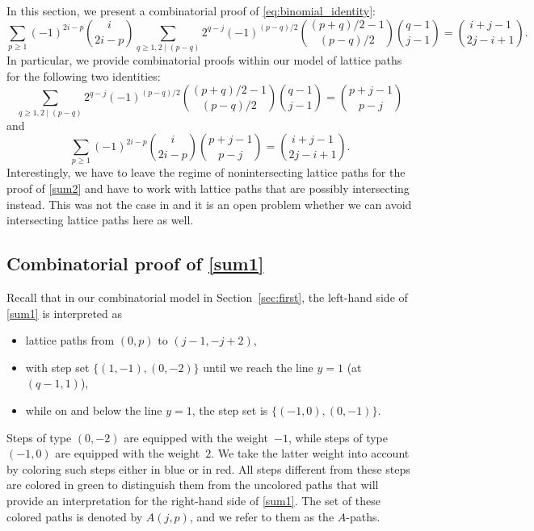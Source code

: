 \documentclass[12pt]{amsart}
\theoremstyle{definition}
\numberwithin{equation}{section}
\begin{document}
In this section, we present a combinatorial proof of \eqref{eq:binomial_identity}:
\begin{equation*}
	\sum_{p \ge 1} (-1)^{2i-p} \binom{i}{2i-p}  \sum_{q \ge 1,2 \mid (p-q)}  2^{q-j} (-1)^{(p-q)/2} \binom{(p+q)/2-1}{(p-q)/2} \binom{q-1}{j-1}
	=  \binom{i+j-1}{2j-i+1}.
\end{equation*}
In particular, we provide combinatorial proofs within our model of lattice paths for the following two identities:
\begin{equation}
	\label{sum1} 
	\sum_{q \ge 1, 2 \mid (p-q)}  2^{q-j} (-1)^{(p-q)/2} \binom{(p+q)/2-1}{(p-q)/2} \binom{q-1}{j-1} = \binom{p+j-1}{p-j}
\end{equation} 
and
\begin{equation}
	\label{sum2} 
	\sum_{p \ge 1} (-1)^{2i-p} \binom{i}{2i-p} \binom{p+j-1}{p-j} = \binom{i+j-1}{2j-i+1}.
\end{equation}
Interestingly, we have to leave the regime of nonintersecting lattice paths for the proof of \eqref{sum2} and have to work with lattice paths that are possibly intersecting instead. This was not the case in \cite{nASMDPP} and it is an open problem whether we can avoid intersecting lattice paths here as well.
\subsection{\texorpdfstring{Combinatorial proof of \eqref{sum1}}{Combinatorial proof of (6.1)}} 
\label{innersection} 

Recall that in our combinatorial model in Section~\ref{sec:first}, the left-hand side of \eqref{sum1} is interpreted as 
\begin{itemize} 
	\item lattice paths from $(0,p)$ to $(j-1,-j+2)$, 
	\item with step set $\{(1,-1),(0,-2)\}$ until we reach the line $y=1$ (at $(q-1,1)$), 
	\item while on and below the line $y=1$, the step set is $\{(-1,0),(0,-1)\}$. 
\end{itemize} 
Steps of type $(0,-2)$ are equipped with the weight~$-1$, while steps of type $(-1,0)$ are equipped with the weight~$2$. We take the latter weight into account by coloring such steps either in blue or in red. All steps different from these steps are colored in green to distinguish them from the uncolored paths that will provide an interpretation for the right-hand side of \eqref{sum1}.
The set of these colored paths is denoted by $A(j,p)$, and we refer to them as the $A$-paths.
\end{document}
